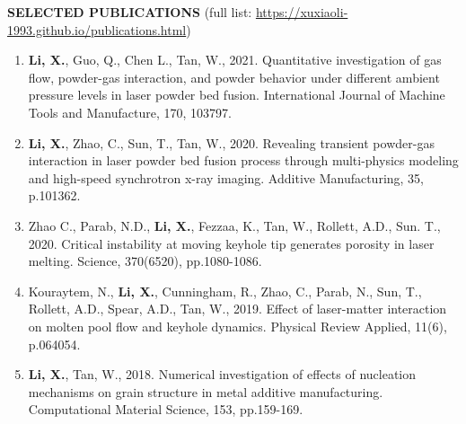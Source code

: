 \documentclass[11pt, letterpaper]{article}
\begin{document}
\textbf{SELECTED PUBLICATIONS} \hfill (full list:  
\href{https://xuxiaoli-1993.github.io/publications.html}
{https://xuxiaoli-1993.github.io/publications.html})

\fullrule

\begin{enumerate}[leftmargin=*, labelsep=4mm]
   \item \textbf{Li, X.}, Guo, Q., Chen L., Tan, W., 2021. Quantitative investigation of gas flow,
      powder-gas interaction, and powder behavior under different ambient pressure levels in laser
      powder bed fusion.  International Journal of Machine Tools and Manufacture, 170, 103797.

   \item \textbf{Li, X.}, Zhao, C., Sun, T., Tan, W., 2020. Revealing transient powder-gas
      interaction in laser powder bed fusion process through multi-physics modeling and high-speed
      synchrotron x-ray imaging. Additive Manufacturing, 35, p.101362. 

   \item Zhao C., Parab, N.D., \textbf{Li, X.}, Fezzaa, K., Tan, W., Rollett, A.D., Sun. T., 2020.
      Critical instability at moving keyhole tip generates porosity in laser melting. Science,
      370(6520), pp.1080-1086.


   \item Kouraytem, N., \textbf{Li, X.}, Cunningham, R., Zhao, C., Parab, N., Sun, T., Rollett,
      A.D., Spear, A.D., Tan, W., 2019. Effect of laser-matter interaction on molten pool flow and
      keyhole dynamics. Physical Review Applied, 11(6), p.064054.


   \item \textbf{Li, X.}, Tan, W., 2018. Numerical investigation of effects of nucleation mechanisms
      on grain structure in metal additive manufacturing. Computational Material Science, 153,
      pp.159-169.

\end{enumerate}
\end{document}
